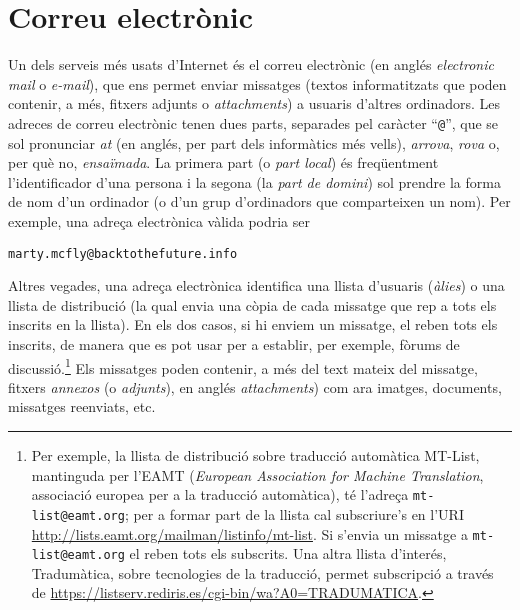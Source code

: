 \section{Correu electrònic}
\label{ss:correue}
Un dels serveis més usats d'Internet és el correu electrònic (en
anglés \emph{electronic mail} o \emph{e-mail}), que ens permet enviar
missatges (textos informatitzats que poden contenir, a més, fitxers
adjunts o \emph{attachments}) a usuaris d'altres ordinadors.  Les
adreces de correu electrònic tenen dues parts, separades pel caràcter
``\texttt{@}'', que se sol pronunciar \emph{at} (en anglés, per part
dels informàtics més vells), {\em arrova}, \emph{rova} o, per què no,
\emph{ensaïmada}. La primera part (o \emph{part local}) és
freqüentment l'identificador d'una persona i la segona (la \emph{part
  de domini}) sol prendre la forma de nom d'un ordinador (o d'un grup
d'ordinadors que comparteixen un nom). Per exemple, una adreça
electrònica vàlida podria ser
\begin{center}
{\tt marty.mcfly@backtothefuture.info}
\end{center}
Altres vegades, una adreça electrònica identifica una llista d'usuaris
(\emph{àlies}) o una llista de distribució (la qual envia una còpia de
cada missatge que rep a tots els inscrits en la llista). En els dos
casos, si hi enviem un missatge, el reben tots els inscrits, de manera
que es pot usar per a establir, per exemple, fòrums de
discussió.\footnote{Per exemple, la llista de distribució sobre
  traducció automàtica MT-List, mantinguda per l'EAMT (\emph{European
    Association for Machine Translation}, associació europea per a la
  traducció automàtica), té l'adreça \texttt{mt-list@eamt.org}; per a
  formar part de la llista cal subscriure's en l'URI
  \url{http://lists.eamt.org/mailman/listinfo/mt-list}. Si s'envia un
  missatge a \texttt{mt-list@eamt.org} el reben tots els
  subscrits. Una altra llista d'interés, Tradumàtica, sobre
  tecnologies de la traducció, permet subscripció a través de
  \url{https://listserv.rediris.es/cgi-bin/wa?A0=TRADUMATICA}.}
  \label{pg:annex} Els missatges poden contenir, a més del text mateix
  del missatge, fitxers \emph{annexos} (o \emph{adjunts}), en anglés {\em
    attachments}) com ara imatges,  documents, missatges reenviats, etc.


